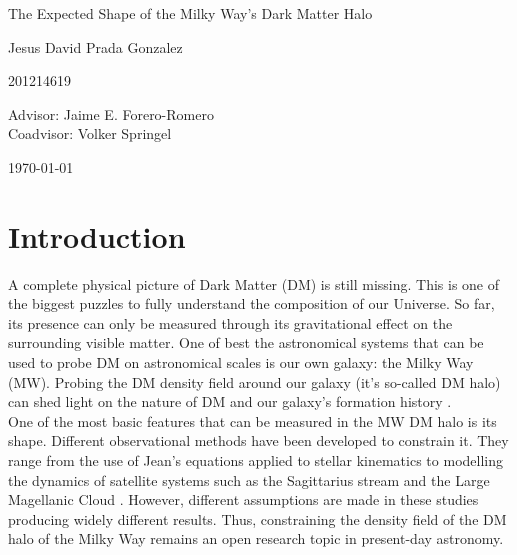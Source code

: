 \documentclass[12pt]{article}
\begin{document}
\begin{center}
\Huge
The Expected Shape of the Milky Way's Dark Matter Halo

\vspace{3mm}
\Large Jesus David Prada Gonzalez

\large
201214619


\vspace{2mm}
\Large
Advisor: Jaime E. Forero-Romero\\
Coadvisor: Volker Springel
\normalsize
\vspace{2mm}

\today
\end{center}


\normalsize
\section{Introduction}


A complete physical picture of Dark Matter (DM) is still missing.
This is one of the biggest puzzles to fully understand the composition of our Universe.
So far, its presence can only be measured through its gravitational effect on the surrounding visible matter. 
One of best the astronomical systems that can be used to probe DM on astronomical scales is our own galaxy: the Milky Way (MW).
Probing the DM density field around our galaxy (it's so-called DM halo) can shed light on the nature of DM \cite{Nipoti,ReadMoore} and our
galaxy's formation history \cite{Read1,Read2,Vera-Ciro2011}.\\

One of the most basic features that can be measured in the MW DM halo is its shape. 
Different observational methods have been developed to constrain it. 
They range from the use of Jean's equations applied to stellar kinematics \cite{Loebman2012} to modelling the dynamics of satellite
systems such as the Sagittarius stream and the Large Magellanic Cloud \cite{Vera-Ciro2013,Deg2012,LawMajewski2010}. 
However, different assumptions are made in these studies producing widely different results.
Thus, constraining the density field of the DM halo of the Milky Way remains an open research topic in present-day astronomy.\\ 
\end{document}

